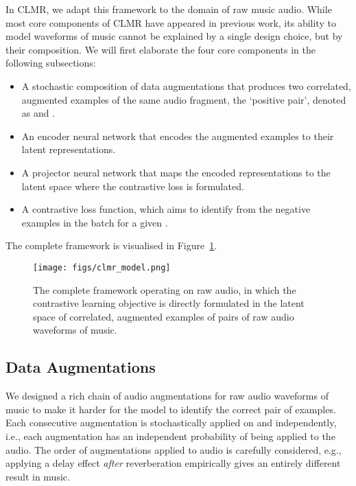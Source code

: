 \documentclass{article}
\begin{document}
In CLMR, we adapt this framework to the domain of raw music audio. While most core components of CLMR have appeared in previous work, its ability to model waveforms of music cannot be explained by a single design choice, but by their composition.
We will first elaborate the four core components in the following subsections:
\begin{itemize}[topsep=0pt, partopsep=0pt, leftmargin=13pt, parsep=0pt, itemsep=4pt]
    \item A stochastic composition of data augmentations that produces two correlated, augmented examples of the same audio fragment, the `positive pair', denoted as  and .
    \item An encoder neural network  that encodes the augmented examples to their latent representations.
    \item A projector neural network  that maps the encoded representations to the latent space where the contrastive loss is formulated.
    \item A contrastive loss function, which aims to identify  from the negative examples in the batch  for a given .
\end{itemize}

The complete framework is visualised in Figure~\ref{fig:clmr_model}.

\begin{figure}[t]
    \texttt{[image: figs/clmr\_model.png]}
    \caption{The complete framework operating on raw audio, in which the contrastive learning objective is directly formulated in the latent space of correlated, augmented examples of pairs of raw audio waveforms of music.}
    \label{fig:clmr_model}
\end{figure}


\subsection{Data Augmentations}
We designed a rich chain of audio augmentations for raw audio waveforms of music to make it harder for the model to identify the correct pair of examples.
Each consecutive augmentation is stochastically applied on  and  independently, i.e., each augmentation has an independent probability  of being applied to the audio.
The order of augmentations applied to audio is carefully considered, e.g., applying a delay effect \textit{after} reverberation empirically gives an entirely different result in music.
\end{document}
